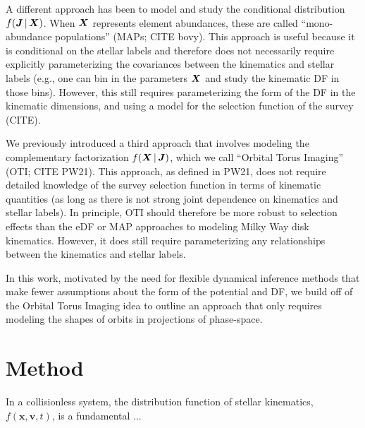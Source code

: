 A different approach has been to model and study the conditional distribution $f(\boldsymbol{J}
\,|\, \boldsymbol{X})$.
When $\boldsymbol{X}$ represents element abundances, these are called ``mono-abundance
populations'' (MAPs; CITE bovy).
This approach is useful because it is conditional on the stellar labels and therefore
does not necessarily require explicitly parameterizing the covariances between the
kinematics and stellar labels (e.g., one can bin in the parameters $\boldsymbol{X}$ and study
the kinematic DF in those bins).
However, this still requires parameterizing the form of the DF in the kinematic
dimensions, and using a model for the selection function of the survey (CITE).

We previously introduced a third approach that involves modeling the complementary
factorization $f(\boldsymbol{X} \,|\, \boldsymbol{J})$, which we call ``Orbital Torus Imaging'' (OTI;
CITE PW21).
This approach, as defined in PW21, does not require detailed knowledge of the survey
selection function in terms of kinematic quantities (as long as there is not strong
joint dependence on kinematics and stellar labels).
In principle, OTI should therefore be more robust to selection effects than the eDF or
MAP approaches to modeling Milky Way disk kinematics.
However, it does still require parameterizing any relationships between the kinematics
and stellar labels.

In this work, motivated by the need for flexible dynamical inference methods that make
fewer assumptions about the form of the potential and DF, we build off of the Orbital
Torus Imaging idea to outline an approach that only requires modeling the shapes of
orbits in projections of phase-space.




\section{Method} \label{sec:method}



In a collisionless system, the distribution function of stellar kinematics,
$f(\boldsymbol{x}, \boldsymbol{v}, t)$, is a fundamental ...

